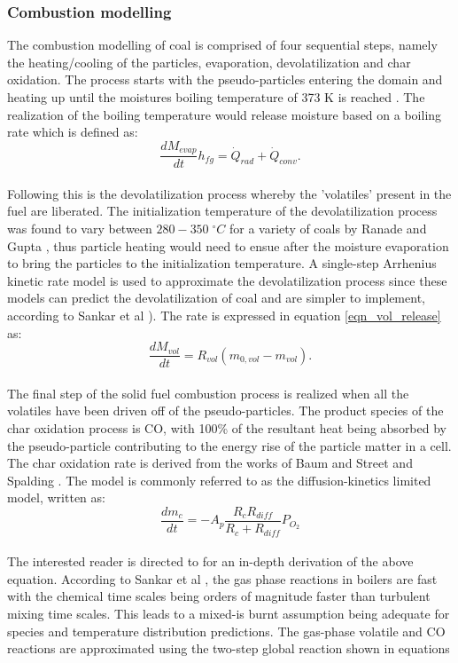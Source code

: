 \documentclass{webofc}
\begin{document}
\subsubsection{Combustion modelling}
The combustion modelling of coal is comprised of four sequential steps, namely the heating/cooling of the particles, evaporation, devolatilization and char oxidation. The process starts with the pseudo-particles entering the domain and heating up until the moistures boiling temperature of 373 K is reached \cite{cengel}. The realization of the boiling temperature would release moisture based on a boiling rate which is defined as:
\\
\begin{equation}\label{eqn_evap_release}
\frac{dM_{evap}}{dt}h_{fg}=\dot{Q}_{rad} + \dot{Q}_{conv}.
\end{equation}
\\
Following this is the devolatilization process whereby the 'volatiles' present in the fuel are liberated. The initialization temperature of the devolatilization process was found to vary between $280 - 350\;^{\circ}C$ for a variety of coals by Ranade and Gupta \cite{gupta}, thus particle heating would need to ensue after the moisture evaporation to bring the particles to the initialization temperature. A single-step Arrhenius kinetic rate model is used to approximate the devolatilization process since these models can predict the devolatilization of coal and are simpler to implement, according to Sankar et al \cite{sankar}). The rate is expressed in equation \ref{eqn_vol_release} as:\\
\begin{equation}\label{eqn_vol_release}
\frac{dM_{vol}}{dt}=R_{vol}(m_{0,vol}-m_{vol}).
\end{equation}\\
The final step of the solid fuel combustion process is realized when all the volatiles have been driven off of the pseudo-particles. The product species of the char oxidation process is CO, with 100\% of the resultant heat being absorbed by the pseudo-particle contributing to the energy rise of the particle matter in a cell. The char oxidation rate is derived from the works of Baum and Street \cite{baum} and Spalding \cite{spalding}. The model is commonly referred to as the diffusion-kinetics limited model, written as:
\begin{equation}\label{eqn_char_release}
\frac{dm_c}{dt}=-A_{p}\frac{R_{c}R_{diff}}{R_{c}+R_{diff}}P_{O_{2}}
\end{equation}
\\
The interested reader is directed to \cite{ansys} for an in-depth derivation of the above equation. According to Sankar et al \cite{sankar}, the gas phase reactions in boilers are fast with the chemical time scales being orders of magnitude faster than turbulent mixing time scales. This leads to a mixed-is burnt assumption being adequate for species and temperature distribution predictions. The gas-phase volatile and CO reactions are approximated using the two-step global reaction shown in equations 
\end{document}
